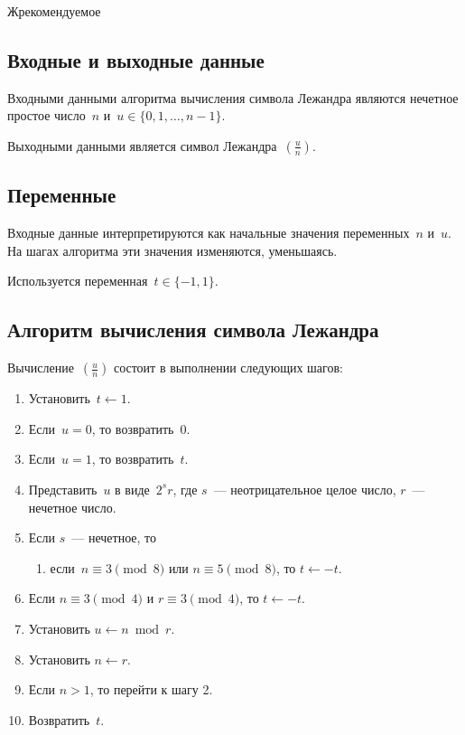 \begin{appendix}{Ж}{рекомендуемое}
\subsection{Входные и выходные данные}

Входными данными алгоритма вычисления символа Лежандра
являются нечетное простое число~$n$ и~$u\in\{0,1,\ldots,n-1\}$.

Выходными данными является символ Лежандра~$\left(\frac{u}{n}\right)$.

\subsection{Переменные}

Входные данные интерпретируются как начальные
значения переменных~$n$ и~$u$.
На шагах алгоритма эти значения изменяются, уменьшаясь.

Используется переменная~$t\in\{-1,1\}$.

\subsection{Алгоритм вычисления символа Лежандра}
\label{LEGENDRE.Alg}

Вычисление~$\left(\frac{u}{n}\right)$ 
состоит в выполнении следующих шагов:
\begin{enumerate}
\item
Установить~$t\leftarrow 1$.

\item
Если~$u=0$, то возвратить~$0$.

\item
Если~$u=1$, то возвратить~$t$.

\item
Представить~$u$ в виде~$2^s r$, 
где $s$~--- неотрицательное целое число, 
$r$~--- нечетное число.

\item
Если $s$~--- нечетное, то
\begin{enumerate} 
\item
если~$n\equiv 3\pmod{8}$ или $n\equiv 5\pmod{8}$, 
то $t\leftarrow -t$.
\end{enumerate} 

\item
Если $n\equiv 3\pmod{4}$ и $r\equiv 3\pmod{4}$, 
то $t\leftarrow -t$.

\item
Установить $u\leftarrow n\bmod r$.

\item
Установить $n\leftarrow r$.

\item
Если $n>1$, то перейти к шагу 2.

\item
Возвратить~$t$.
\end{enumerate}

\end{appendix}
